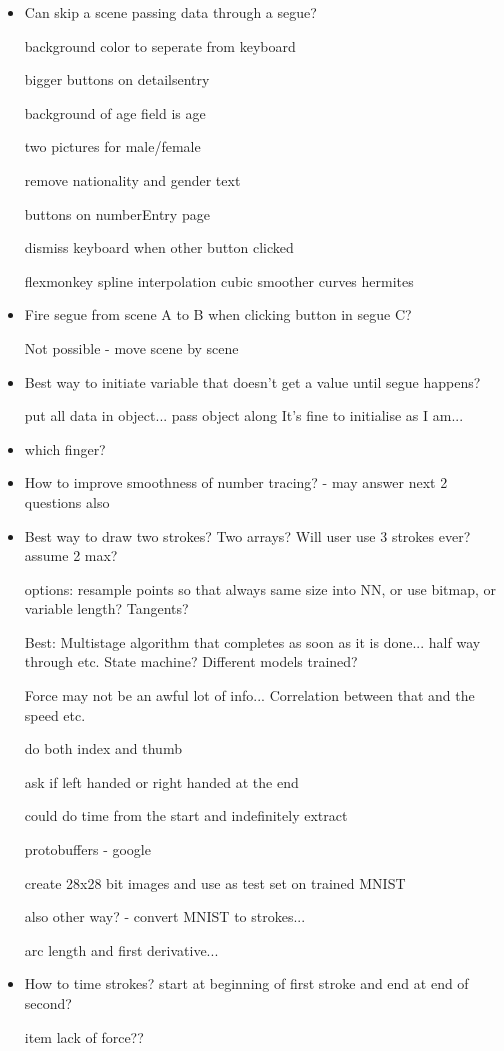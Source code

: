 \documentclass[]{weekly-report}
\begin{document}
\begin{itemize}
\item Can skip a scene passing data through a segue?

background color to seperate from keyboard

bigger buttons on detailsentry

background of age field is age

two pictures for male/female

remove nationality and gender text

buttons on numberEntry page

dismiss keyboard when other button clicked

flexmonkey spline interpolation cubic smoother curves hermites


\item Fire segue from scene A to B when clicking button in segue C?

 Not possible - move scene by scene

\item Best way to initiate variable that doesn’t get a value until segue happens?

put all data in object... pass object along
It's fine to initialise as I am...

\item which finger?

\item How to improve smoothness of number tracing? - may answer next 2 questions also

\item Best way to draw two strokes? Two arrays? Will user use 3 strokes ever? assume 2 max?

options:
resample points so that always same size into NN, or use bitmap, or variable length?
Tangents?

Best:
Multistage algorithm that completes as soon as it is done... half way through etc.
State machine?
Different models trained?

Force may not be an awful lot of info...
Correlation between that and the speed etc. 

do both index and thumb

ask if left handed or right handed at the end

could do time from the start and indefinitely extract

protobuffers - google

create 28x28 bit images and use as test set on trained MNIST

also other way? - convert MNIST to strokes...

arc length and first derivative...

\item How to time strokes? start at beginning of first stroke and end at end of second?

item lack of force??

\end{itemize}
\end{document}
